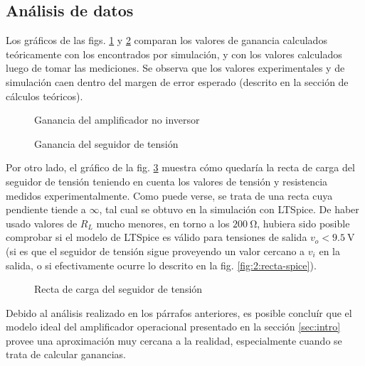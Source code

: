 \subsection{Análisis de datos}

Los gráficos de las figs. \ref{fig:2-analisis:ganancia-opamp} y 
\ref{fig:2-analisis:ganancia-seguidor} comparan los valores
de ganancia calculados teóricamente con los encontrados por simulación, y con
los valores calculados luego de tomar las mediciones. Se observa que los
valores experimentales y de simulación caen dentro del margen de error
esperado (descrito en la sección de cálculos teóricos).

\begin{figure}[H]
    \centering
    
    \caption{Ganancia del amplificador no inversor}
    \label{fig:2-analisis:ganancia-opamp}
\end{figure}

\begin{figure}[H]
    \centering
    
    \caption{Ganancia del seguidor de tensión}
    \label{fig:2-analisis:ganancia-seguidor}
\end{figure}

Por otro lado, el gráfico de la fig. \ref{fig:2-analisis:recta-carga} muestra
cómo quedaría la recta de carga del seguidor de tensión teniendo en cuenta
los valores de tensión y resistencia medidos experimentalmente. Como puede
verse, se trata de una recta cuya pendiente tiende a $\infty$, tal cual se
obtuvo en la simulación con LTSpice. De haber usado valores de $R_L$ mucho
menores, en torno a los $\SI{200}{\ohm}$, hubiera sido posible comprobar si
el modelo de LTSpice es válido para tensiones de salida
$v_o < \SI{9.5}{\volt}$ (si es que el seguidor de tensión sigue proveyendo
un valor cercano a $v_i$ en la salida, o si efectivamente ocurre lo descrito
en la fig. \ref{fig:2:recta-spice}).

\begin{figure}[H]
    \centering
    
    \caption{Recta de carga del seguidor de tensión}
    \label{fig:2-analisis:recta-carga}
\end{figure}

Debido al análisis realizado en los párrafos anteriores, es posible concluír
que el modelo ideal del amplificador operacional presentado en la sección
\ref{sec:intro} provee una aproximación muy cercana a la realidad, 
especialmente cuando se trata de calcular ganancias.
